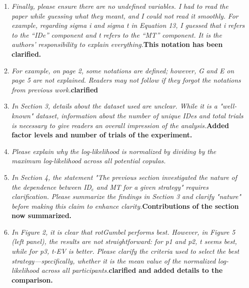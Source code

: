 \documentclass{article}
\begin{document}
\begin{enumerate}
{    would like the authors to emphasize that.} One of the objectives being a parametric model, Reinforcement learning can not achieve that. Processing time is also very quick (almost immediate) for the typical sample size used in HCI experiments. \textbf{Comparison with RL treated in the new related work section.}
    \item \textit{Finally, please ensure there are no undefined variables. I had to read the paper while guessing what they meant, and I could not read it smoothly. For example, regarding sigma i and sigma t in Equation 13, I guessed that i refers to the “IDe” component and t refers to the “MT” component. It is the authors' responsibility to explain everything.}\textbf{This notation has been clarified.}
    \item \textit{For example, on page 2, some notations are defined; however, G and E on page 5 are not explained. Readers may not follow if they forgot the notations from previous work.}\textbf{clarified}
    \item \textit{In Section 3, details about the dataset used are unclear. While it is a "well-known" dataset, information about the number of unique IDes and total trials is necessary to give readers an overall impression of the analysis.}\textbf{Added factor levels and number of trials of the experiment.}
    \item \textit{Please explain why the log-likelihood is normalized by dividing by the maximum log-likelihood across all potential copulas.}
    \item \textit{In Section 4, the statement "The previous section investigated the nature of the dependence between ID$_e$ and MT for a given strategy" requires clarification. Please summarize the findings in Section 3 and clarify "nature" before making this claim to enhance clarity.}\textbf{Contributions of the section now summarized.}
    \item \textit{In Figure 2, it is clear that rotGumbel performs best. However, in Figure 5 (left panel), the results are not straightforward: for p1 and p2, t seems best, while for p3, t-EV is better. Please clarify the criteria used to select the best strategy—specifically, whether it is the mean value of the normalized log-likelihood across all participants.}\textbf{clarified and added details to the comparison.}

\end{enumerate}
\end{document}
